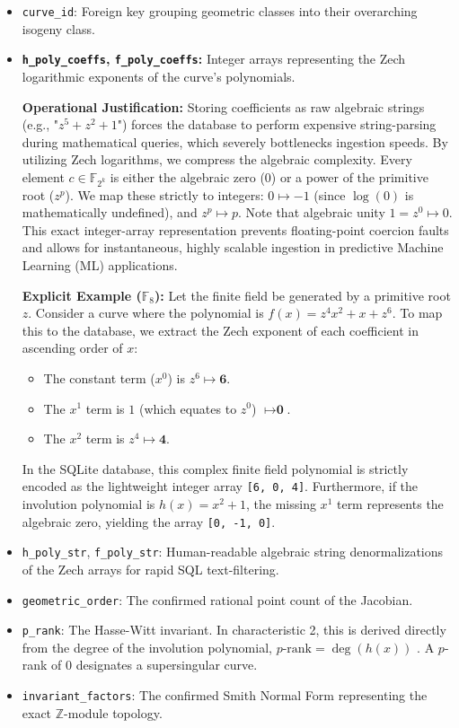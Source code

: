 \documentclass[11pt,letterpaper]{article}
\begin{document}
\begin{itemize}
\item \texttt{curve\_id}: Foreign key grouping geometric classes into their overarching isogeny class.
\item \textbf{\texttt{h\_poly\_coeffs}, \texttt{f\_poly\_coeffs}:} Integer arrays representing the Zech logarithmic exponents of the curve's polynomials. 

\textbf{Operational Justification:} Storing coefficients as raw algebraic strings (e.g., "$z^5 + z^2 + 1$") forces the database to perform expensive string-parsing during mathematical queries, which severely bottlenecks ingestion speeds. By utilizing Zech logarithms, we compress the algebraic complexity. Every element $c \in \mathbb{F}_{2^k}$ is either the algebraic zero ($0$) or a power of the primitive root ($z^p$). We map these strictly to integers: $0 \mapsto -1$ (since $\log(0)$ is mathematically undefined), and $z^p \mapsto p$. Note that algebraic unity $1 = z^0 \mapsto 0$. This exact integer-array representation prevents floating-point coercion faults and allows for instantaneous, highly scalable ingestion in predictive Machine Learning (ML) applications.

\textbf{Explicit Example ($\mathbb{F}_{8}$):} Let the finite field be generated by a primitive root $z$. Consider a curve where the polynomial is $f(x) = z^4 x^2 + x + z^6$. To map this to the database, we extract the Zech exponent of each coefficient in ascending order of $x$:
\begin{itemize}
    \item The constant term ($x^0$) is $z^6 \mapsto \textbf{6}$.
    \item The $x^1$ term is $1$ (which equates to $z^0$) $\mapsto \textbf{0}$.
    \item The $x^2$ term is $z^4 \mapsto \textbf{4}$.
\end{itemize}
In the SQLite database, this complex finite field polynomial is strictly encoded as the lightweight integer array \texttt{[6, 0, 4]}. Furthermore, if the involution polynomial is $h(x) = x^2 + 1$, the missing $x^1$ term represents the algebraic zero, yielding the array \texttt{[0, -1, 0]}.

\item \texttt{h\_poly\_str}, \texttt{f\_poly\_str}: Human-readable algebraic string denormalizations of the Zech arrays for rapid SQL text-filtering.
\item \texttt{geometric\_order}: The confirmed rational point count of the Jacobian.
\item \texttt{p\_rank}: The Hasse-Witt invariant. In characteristic 2, this is derived directly from the degree of the involution polynomial, $p\text{-rank} = \deg(h(x))$ \cite{Scholten2002, Manin1963}. A $p$-rank of 0 designates a supersingular curve.
\item \texttt{invariant\_factors}: The confirmed Smith Normal Form representing the exact $\mathbb{Z}$-module topology.
\end{itemize}
\end{document}
